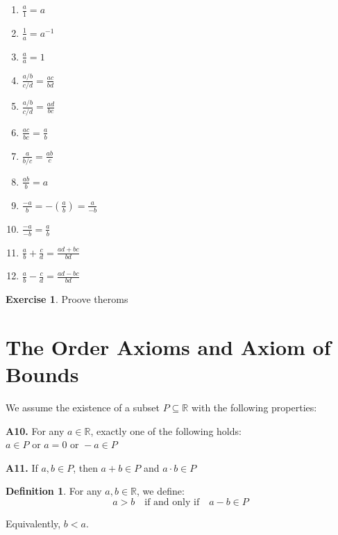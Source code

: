 \documentclass[
]{book}
\providecommand{\tightlist}{%
  \setlength{\itemsep}{0pt}\setlength{\parskip}{0pt}}
\theoremstyle{definition}
\newtheorem{definition}{Definition}[chapter]
\theoremstyle{definition}
\theoremstyle{definition}
\newtheorem{exercise}{Exercise}[chapter]
\theoremstyle{definition}
\theoremstyle{remark}
\begin{document}
\begin{enumerate}
  \begin{enumerate}
  \def\labelenumii{\alph{enumii}.}
  \tightlist
  \item
    \(\frac{a}{1} = a\)
  \item
    \(\frac{1}{a} = a^{-1}\)
  \item
    \(\frac{a}{a} = 1\)
  \item
    \(\frac{a/b}{c/d} = \frac{ac}{bd}\)
  \item
    \(\frac{a/b}{c/d} = \frac{ad}{bc}\)
  \item
    \(\frac{ac}{bc} = \frac{a}{b}\)
  \item
    \(\frac{a}{b/c} = \frac{ab}{c}\)
  \item
    \(\frac{ab}{b} = a\)
  \item
    \(\frac{-a}{b} = -\left( \frac{a}{b} \right) = \frac{a}{-b}\)
  \item
    \(\frac{-a}{-b} = \frac{a}{b}\)
  \item
    \(\frac{a}{b} + \frac{c}{d} = \frac{ad + bc}{bd}\)
  \item
    \(\frac{a}{b} - \frac{c}{d} = \frac{ad - bc}{bd}\)
  \end{enumerate}
\end{enumerate}

\begin{exercise}
\protect\hypertarget{exr:unnamed-chunk-94}{}\label{exr:unnamed-chunk-94}Proove theroms
\end{exercise}

\section{The Order Axioms and Axiom of Bounds}\label{the-order-axioms-and-axiom-of-bounds}

We assume the existence of a subset \(P \subseteq \mathbb{R}\) with the following properties:

\textbf{A10.} For any \(a \in \mathbb{R}\), exactly one of the following holds:
\(a \in P \text{ or }  a = 0 \text{ or } -a \in P\)

\textbf{A11.} If \(a, b \in P\), then \(a + b \in P\) and \(a \cdot b \in P\)

\begin{definition}
\protect\hypertarget{def:unnamed-chunk-95}{}\label{def:unnamed-chunk-95}For any \(a, b \in \mathbb{R}\), we define:
\[
a > b \quad \text{if and only if} \quad a - b \in P
\]

Equivalently, \(b < a\).
\end{definition}
\end{document}
